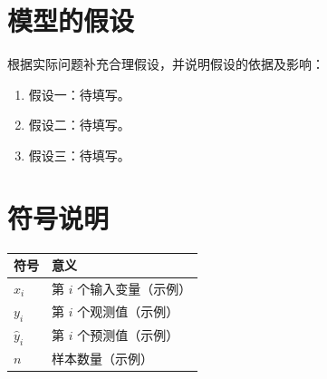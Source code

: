 \section{模型的假设}
根据实际问题补充合理假设，并说明假设的依据及影响：
\begin{enumerate}
  \item 假设一：待填写。
  \item 假设二：待填写。
  \item 假设三：待填写。
\end{enumerate}

\section{符号说明}
\begin{table}[H]
  \centering
  \renewcommand{\arraystretch}{1.2}
  \begin{tabularx}{0.9\textwidth}{>{\centering\arraybackslash}p{}X}
    \toprule
    \rowcolor{color3!45}\textbf{符号} & \textbf{意义} \\
    \midrule
    $x_i$ & 第 $i$ 个输入变量（示例） \\
    $y_i$ & 第 $i$ 个观测值（示例） \\
    $\hat{y}_i$ & 第 $i$ 个预测值（示例） \\
    $n$ & 样本数量（示例） \\
    \bottomrule
  \end{tabularx}
\end{table}

